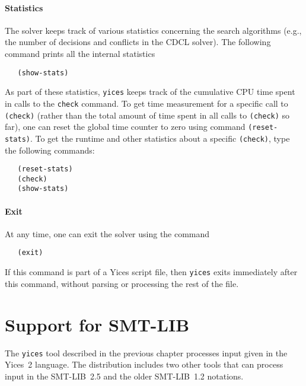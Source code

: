 \documentclass[11pt,twoside,fleqn,openright,titlepage]{cslreport}
\begin{document}
\subsubsection*{Statistics}

The solver keeps track of various statistics concerning the search
algorithms (e.g., the number of decisions and conflicts in the CDCL
solver). The following command prints all the internal statistics
\begin{small}
\begin{verbatim}
   (show-stats)
\end{verbatim}
\end{small}
As part of these statistics, \texttt{yices} keeps track of the
cumulative CPU time spent in calls to the \texttt{check} command.  To
get time measurement for a specific call to \texttt{(check)} (rather
than the total amount of time spent in all calls to \texttt{(check)}
so far), one can reset the global time counter to zero using command
\texttt{(reset-stats)}. To get the runtime and other statistics about
a specific \texttt{(check)}, type the following commands:
\begin{small}
\begin{verbatim}
   (reset-stats)
   (check)
   (show-stats)
\end{verbatim}
\end{small}

\subsubsection*{Exit}

At any time, one can exit the solver using the command
\begin{small}
\begin{verbatim}
   (exit)
\end{verbatim}
\end{small}
If this command is part of a Yices script file, then \texttt{yices}
exits immediately after this command, without parsing or processing the
rest of the file.


\chapter{Support for SMT-LIB}
\label{yices-smt}

The \texttt{yices} tool described in the previous chapter processes
input given in the Yices~2 language. The distribution includes two
other tools that can process input in the SMT-LIB~2.5 and the older
SMT-LIB~1.2 notations.
\end{document}
